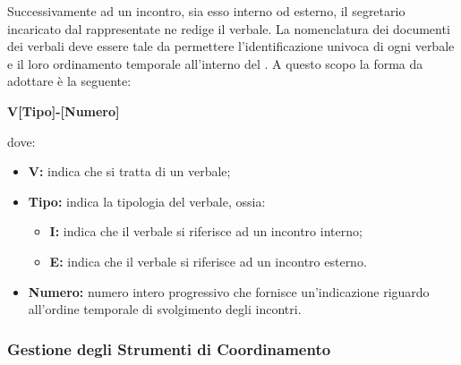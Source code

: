 				Successivamente ad un incontro, sia esso interno od esterno, il segretario incaricato dal rappresentate ne redige il verbale.
				\newline
				La nomenclatura dei documenti dei verbali deve essere tale da permettere l'identificazione univoca di ogni verbale e il loro ordinamento temporale all'interno del . A questo scopo la forma da adottare è la seguente:
				\begin{center}
					\textbf{V[Tipo]-[Numero]}
				\end{center}
				dove:
				\begin{itemize}
					\item \textbf{V:} indica che si tratta di un verbale;
					\item \textbf{Tipo:} indica la tipologia del verbale, ossia:
					\begin{itemize}
						\item \textbf{I:} indica che il verbale si riferisce ad un incontro interno;
						\item \textbf{E:} indica che il verbale si riferisce ad un incontro esterno.
					\end{itemize}
					\item \textbf{Numero:} numero intero progressivo che fornisce un'indicazione riguardo all'ordine temporale di svolgimento degli incontri.
				\end{itemize}
		
		\subsubsection{Gestione degli Strumenti di Coordinamento}

